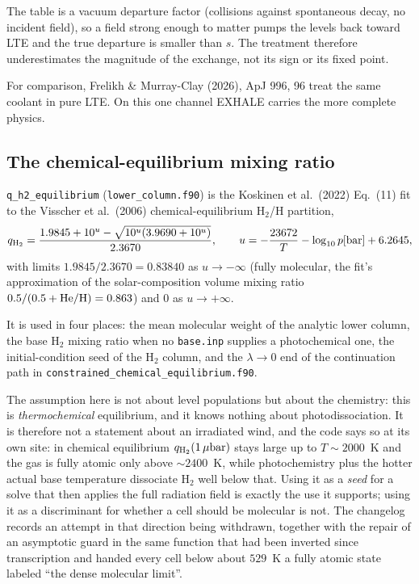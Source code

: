 \documentclass[english,a4paper]{my_memo}
\begin{document}
The table is a vacuum departure factor (collisions against spontaneous
decay, no incident field), so a field strong enough to matter pumps the
levels back toward LTE and the true departure is smaller than $s$. The
treatment therefore underestimates the magnitude of the exchange, not its
sign or its fixed point.

For comparison, Frelikh \& Murray-Clay (2026), ApJ 996, 96 treat the same
coolant in pure LTE. On this one channel EXHALE carries the more complete
physics.

\subsection{The chemical-equilibrium mixing ratio}
\label{sec:qh2}

\texttt{q\_h2\_equilibrium} (\texttt{lower\_column.f90}) is the
Koskinen et al.\ (2022) Eq.~(11) fit to the Visscher et al.\ (2006)
chemical-equilibrium H$_2$/H partition,
%
\begin{equation}
  q_{\rm H_2} = \frac{1.9845 + 10^{u} - \sqrt{10^{u}(3.9690 + 10^{u})}}{2.3670},
  \qquad
  u = -\frac{23672}{T} - \log_{10} p[\mathrm{bar}] + 6.2645 ,
\end{equation}
%
with limits $1.9845/2.3670 = 0.83840$ as $u \rightarrow -\infty$ (fully
molecular, the fit's approximation of the solar-composition volume mixing
ratio $0.5/(0.5+{\rm He/H}) = 0.863$) and $0$ as $u \rightarrow +\infty$.

It is used in four places: the mean molecular weight of the analytic lower
column, the base H$_2$ mixing ratio when no \texttt{base.inp} supplies a
photochemical one, the initial-condition seed of the H$_2$ column, and the
$\lambda \rightarrow 0$ end of the continuation path in
\texttt{constrained\_chemical\_equilibrium.f90}.

The assumption here is not about level populations but about the chemistry:
this is \emph{thermochemical} equilibrium, and it knows nothing about
photodissociation. It is therefore not a statement about an irradiated wind,
and the code says so at its own site: in chemical equilibrium
$q_{\rm H_2}(1\,\mu\mathrm{bar})$ stays large up to $T \sim 2000$~K and the
gas is fully atomic only above $\sim 2400$~K, while photochemistry plus the
hotter actual base temperature dissociate H$_2$ well below that. Using it as a
\emph{seed} for a solve that then applies the full radiation field is exactly
the use it supports; using it as a discriminant for whether a cell should be
molecular is not. The changelog records an
attempt in that direction being withdrawn, together with the repair of an
asymptotic guard in the same function that had been inverted since
transcription and handed every cell below about $529$~K a fully atomic state
labeled ``the dense molecular limit''.
\end{document}
